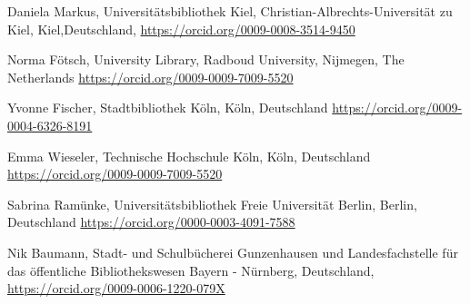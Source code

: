 \documentclass[a4paper,
fontsize=11pt,
oneside,
numbers=noperiodatend,
parskip=half-,
bibliography=totoc,
final
]{scrartcl}
\begin{document}
Daniela Markus, Universitätsbibliothek Kiel, Christian-Albrechts-Universität zu Kiel, Kiel,\linebreak Deutschland, \url{https://orcid.org/0009-0008-3514-9450}

Norma Fötsch, University Library, Radboud University, Nijmegen, The Netherlands\newline
\url{https://orcid.org/0009-0009-7009-5520}

Yvonne Fischer, Stadtbibliothek Köln, Köln, Deutschland\newline
\url{https://orcid.org/0009-0004-6326-8191}

Emma Wieseler, Technische Hochschule Köln, Köln, Deutschland\newline
\url{https://orcid.org/0009-0009-7009-5520}

Sabrina Ramünke, Universitätsbibliothek Freie Universität Berlin, Berlin, Deutschland\newline
\url{https://orcid.org/0000-0003-4091-7588}

Nik Baumann, Stadt- und Schulbücherei Gunzenhausen und Landesfachstelle für das öffentliche Bibliothekswesen Bayern - Nürnberg, Deutschland, \url{https://orcid.org/0009-0006-1220-079X}
\end{document}

